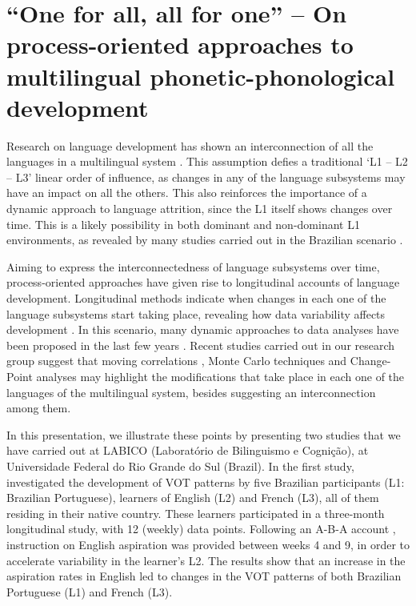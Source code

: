 \chapter{“One for all, all for one” -- On process-oriented approaches to multilingual phonetic-phonological development}\label{ch:ubirata}
\begin{affils}
\end{affils}

\noindent
Research on language development has shown an interconnection of all the
languages in a multilingual system \citep{herdina2001,pereyron2017}.
This assumption defies a traditional ‘L1 – L2 – L3’ linear order of
influence, as changes in any of the language subsystems may have an
impact on all the others. This also reinforces the importance of a dynamic
approach to language attrition, since the L1 itself shows changes over time.
This is a likely possibility in both dominant and non-dominant L1
environments, as revealed by many studies carried out in the Brazilian
scenario \citep{kupske2015,schereschewsky2018,santos2018,alves2019}.

Aiming to express the interconnectedness of language subsystems over
time, process-oriented approaches \citep{lowie2017,lowie2019} 
have given rise to longitudinal accounts of language development.
Longitudinal methods indicate when changes in each one of the language
subsystems start taking place, revealing how data variability affects
development \citep{chang2021}. In this scenario, many dynamic
approaches to data analyses have been proposed in the last few years
\citep{verspoor2011,hiver2019}. Recent
studies carried out in our research group \citep{albuquerque2019,alves2020,schereschewsky2021} 
suggest that moving correlations \citep{verspoor2011b,bulte2020}, Monte
Carlo techniques \citep{verspoor2011,chang2021}
and Change-Point analyses \citep{taylor2000} may highlight the
modifications that take place in each one of the languages of the
multilingual system, besides suggesting an interconnection among them.

In this presentation, we illustrate these points by presenting two studies
that we have carried out at LABICO (Laboratório de Bilinguismo e Cognição),
at Universidade Federal do Rio Grande do Sul (Brazil). In the first study,
\citet{schereschewsky2021} investigated the development of VOT patterns by
five Brazilian participants (L1: Brazilian Portuguese), learners of English (L2)
and French (L3), all of them residing in their native country. These learners
participated in a three-month longitudinal study, with 12 (weekly) data
points. Following an A-B-A account \citep{hiver2019}, instruction
on English aspiration was provided between weeks 4 and 9, in order to
accelerate variability in the learner’s L2. The results show that an increase
in the aspiration rates in English led to changes in the VOT patterns of both
Brazilian Portuguese (L1) and French (L3).

